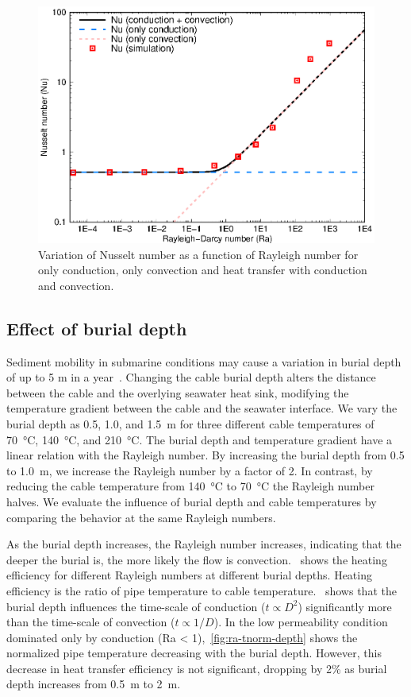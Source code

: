 \documentclass[Journal,letterpaper,InsideFigs]{ascelike-new}
\begin{document}
\begin{figure}
    \centering
    \includegraphics{figs/ra-nu.eps}
    \caption{Variation of Nusselt number as a function of Rayleigh number for only conduction, only convection and heat transfer with conduction and convection.}
    \label{fig:ra-nu}
\end{figure}

\subsection*{Effect of burial depth}
Sediment mobility in submarine conditions may cause a variation in burial depth of up to 5 m in a year~\cite{young2001utilizing}. Changing the cable burial depth alters the distance between the cable and the overlying seawater heat sink, modifying the temperature gradient between the cable and the seawater interface. We vary the burial depth as 0.5, 1.0, and \SI{1.5}{\meter} for three different cable temperatures of \SI{70}{\celsius}, \SI{140}{\celsius}, and \SI{210}{\celsius}. The burial depth and temperature gradient have a linear relation with the Rayleigh number. By increasing the burial depth from 0.5 to \SI{1.0}{\meter}, we increase the Rayleigh number by a factor of 2. In contrast, by reducing the cable temperature from \SI{140}{\celsius} to \SI{70}{\celsius} the Rayleigh number halves. We evaluate the influence of burial depth and cable temperatures by comparing the behavior at the same Rayleigh numbers.

As the burial depth increases, the Rayleigh number increases, indicating that the deeper the burial is, the more likely the flow is convection.~ shows the heating efficiency for different Rayleigh numbers at different burial depths. Heating efficiency is the ratio of pipe temperature to cable temperature.~ shows that the burial depth influences the time-scale of conduction  ($t \propto D^2$) significantly more than the time-scale of convection ($t \propto 1/D$). In the low permeability condition dominated only by conduction (Ra < 1),~\cref{fig:ra-tnorm-depth} shows the normalized pipe temperature decreasing with the burial depth. However, this decrease in heat transfer efficiency is not significant, dropping by 2\% as burial depth increases from \SI{0.5}{\meter} to \SI{2}{\meter}.
\end{document}

